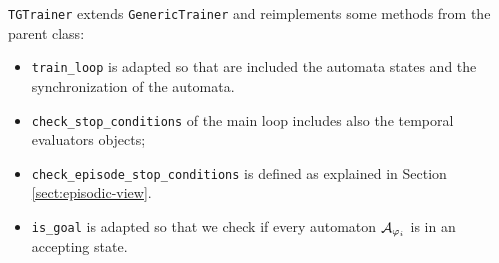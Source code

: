 \texttt{TGTrainer} extends \texttt{GenericTrainer} and reimplements some methods from the parent class:
\begin{itemize}
	\item \texttt{train\_loop} is adapted so that are included the automata states and the synchronization of the automata.
	\item \texttt{check\_stop\_conditions} of the main loop includes also the temporal evaluators objects;
	\item \texttt{check\_episode\_stop\_conditions} is defined as explained in Section \ref{sect:episodic-view}.
	\item \texttt{is\_goal} is adapted so that we check if every automaton $\mathcal{A}_{\varphi_i}$ is in an accepting state.
\end{itemize}

